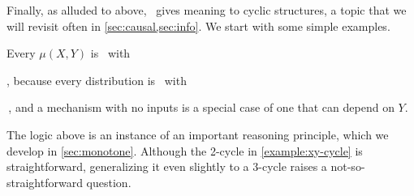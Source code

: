 Finally, as alluded to above, \scibility\ gives meaning to cyclic structures,
    a topic that we will revisit often in \cref{sec:causal,sec:info}. 
We start with some simple examples. 
\begin{example}
        \label{example:xy-cycle}
    Every $\mu(X,Y)$ is \cible\ with
    ,
    because every distribution is \cible\ with
    \,,
    and a mechanism with no inputs is a special case of one that can depend on $Y$.
    \qedhere
\end{example}
The logic above is an instance of an important reasoning principle,
    which we develop in \cref{sec:monotone}. 
Although the 2-cycle in \cref{example:xy-cycle} is straightforward, generalizing it even slightly to a 3-cycle raises a not-so-straightforward question.
     
